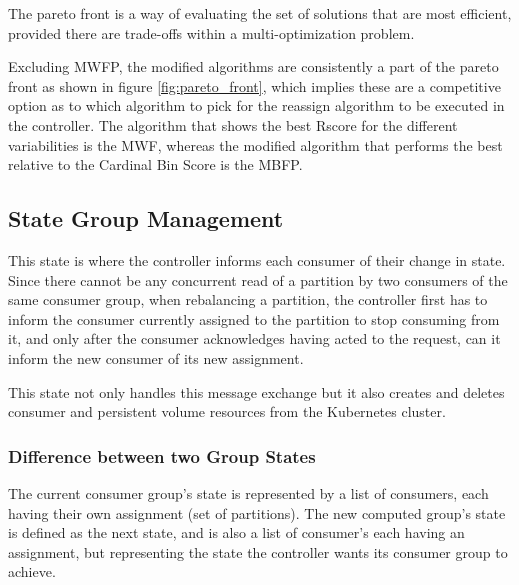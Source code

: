 The pareto front is a way of evaluating the set of solutions that are most
efficient, provided there are trade-offs within a multi-optimization problem.

Excluding MWFP, the modified algorithms are consistently a part of the pareto
front as shown in figure \ref{fig:pareto_front}, which implies these are a
competitive option as to which algorithm to pick for the reassign algorithm to
be executed in the controller. The algorithm that shows the best Rscore for the
different variabilities is the MWF, whereas the modified algorithm that performs
the best relative to the Cardinal Bin Score is the MBFP.

\subsection{State Group Management}
\label{sub:state_group_management}

This state is where the controller informs each consumer of their change in
state. Since there cannot be any concurrent read of a partition by two consumers
of the same consumer group, when rebalancing a partition, the controller first
has to inform the consumer currently assigned to the partition to stop consuming
from it, and only after the consumer acknowledges having acted to the request,
can it inform the new consumer of its new assignment.

This state not only handles this message exchange but it also creates and
deletes consumer and persistent volume resources from the Kubernetes cluster. 

\subsubsection{Difference between two Group States}

The current consumer group's state is represented by a list of consumers, each
having their own assignment (set of partitions). The new computed group's state
is defined as the next state, and is also a list of consumer's each having an
assignment, but representing the state the controller wants its consumer group
to achieve.

